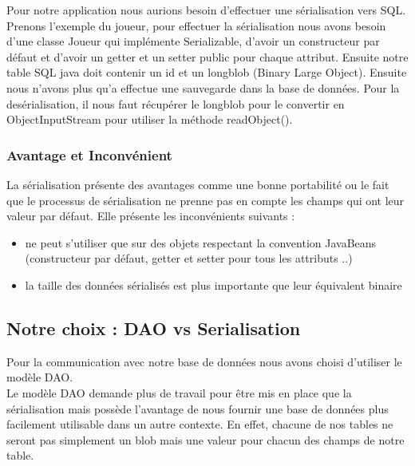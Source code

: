 Pour notre application nous aurions besoin d'effectuer une sérialisation vers SQL. Prenons l'exemple du joueur, pour effectuer la sérialisation nous avons besoin d'une classe Joueur qui implémente Serializable, d'avoir un constructeur par défaut et d'avoir un getter et un setter public pour chaque attribut. Ensuite notre table SQL java doit contenir un id et un longblob (Binary Large Object). Ensuite nous n'avons plus qu'a effectue une sauvegarde dans la base de données. Pour la desérialisation, il nous faut récupérer le longblob pour le convertir en ObjectInputStream pour utiliser la méthode readObject(). 


\subsubsection{Avantage et Inconvénient}
La sérialisation présente des avantages comme une bonne portabilité ou le fait que le processus de sérialisation ne prenne pas en compte les champs qui ont leur valeur par défaut. Elle présente les inconvénients suivants : 
\begin{itemize}
\item ne peut s'utiliser que sur des objets respectant la convention JavaBeans (constructeur par défaut, getter et setter pour tous les attributs ..)
\item la taille des données sérialisés est plus importante que leur équivalent binaire
\end{itemize}


\subsection{Notre choix : DAO vs Serialisation}
Pour la communication avec notre base de données nous avons choisi d'utiliser le modèle DAO. \\

Le modèle DAO demande plus de travail pour être mis en place que la sérialisation mais possède l'avantage de nous fournir une base de données plus facilement utilisable dans un autre contexte. En effet, chacune de nos tables ne seront pas simplement un blob mais une valeur pour chacun des champs de notre table. 